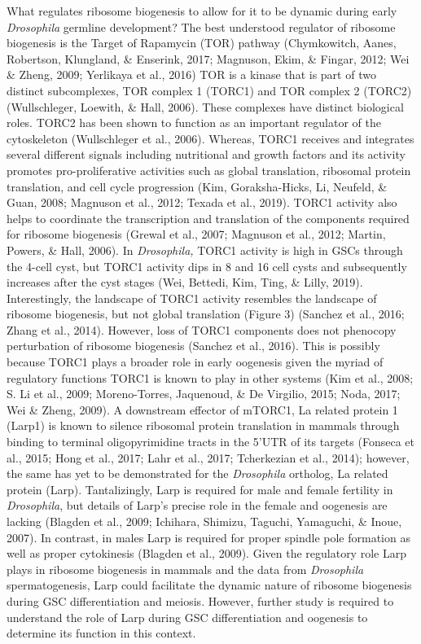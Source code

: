 \documentclass[12pt,twoside]{reedthesis}
\begin{document}
What regulates ribosome biogenesis to allow for it to be dynamic during
early \emph{Drosophila} germline development? The best understood regulator
of ribosome biogenesis is the Target of Rapamycin (TOR) pathway
(Chymkowitch, Aanes, Robertson, Klungland, \& Enserink, 2017; Magnuson, Ekim, \& Fingar, 2012; Wei \& Zheng, 2009; Yerlikaya et al., 2016)
TOR is a kinase that is part of two distinct subcomplexes, TOR complex 1
(TORC1) and TOR complex 2 (TORC2) (Wullschleger, Loewith, \& Hall, 2006). These
complexes have distinct biological roles. TORC2 has been shown to
function as an important regulator of the cytoskeleton
(Wullschleger et al., 2006). Whereas, TORC1 receives and integrates several
different signals including nutritional and growth factors and its
activity promotes pro-proliferative activities such as global
translation, ribosomal protein translation, and cell cycle progression
(Kim, Goraksha-Hicks, Li, Neufeld, \& Guan, 2008; Magnuson et al., 2012; Texada et al., 2019). TORC1 activity also helps
to coordinate the transcription and translation of the components
required for ribosome biogenesis (Grewal et al., 2007; Magnuson et al., 2012; Martin, Powers, \& Hall, 2006). In \emph{Drosophila,} TORC1 activity is high in GSCs through
the 4-cell cyst, but TORC1 activity dips in 8 and 16 cell cysts and
subsequently increases after the cyst stages (Wei, Bettedi, Kim, Ting, \& Lilly, 2019).
Interestingly, the landscape of TORC1 activity resembles the landscape
of ribosome biogenesis, but not global translation (Figure 3)
(Sanchez et al., 2016; Zhang et al., 2014). However, loss of TORC1 components does
not phenocopy perturbation of ribosome biogenesis (Sanchez et al., 2016).
This is possibly because TORC1 plays a broader role in early oogenesis
given the myriad of regulatory functions TORC1 is known to play in other
systems (Kim et al., 2008; S. Li et al., 2009; Moreno-Torres, Jaquenoud, \& De Virgilio, 2015; Noda, 2017; Wei \& Zheng, 2009). A downstream effector of mTORC1, La related protein 1
(Larp1) is known to silence ribosomal protein translation in mammals
through binding to terminal oligopyrimidine tracts in the 5'UTR of its
targets (Fonseca et al., 2015; Hong et al., 2017; Lahr et al., 2017; Tcherkezian et al., 2014); however, the same has yet to be
demonstrated for the \emph{Drosophila} ortholog, La related protein (Larp).
Tantalizingly, Larp is required for male and female fertility in
\emph{Drosophila}, but details of Larp's precise role in the female and
oogenesis are lacking (Blagden et al., 2009; Ichihara, Shimizu, Taguchi, Yamaguchi, \& Inoue, 2007). In contrast,
in males Larp is required for proper spindle pole formation as well as
proper cytokinesis (Blagden et al., 2009). Given the regulatory role Larp
plays in ribosome biogenesis in mammals and the data from \emph{Drosophila}
spermatogenesis, Larp could facilitate the dynamic nature of ribosome
biogenesis during GSC differentiation and meiosis. However, further
study is required to understand the role of Larp during GSC
differentiation and oogenesis to determine its function in this context.
\end{document}
